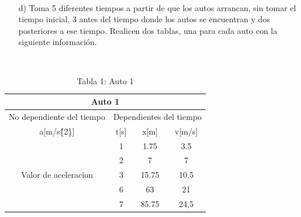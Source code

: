 \documentclass[a4paper, 12pt]{article}
\begin{document}
\begin{enumerate}
\begin{align}
       \end{align} 
    \item [d)] Toma 5 diferentes tiempos a partir de que los autos arrancan, sin tomar el tiempo inicial, 3 antes del tiempo donde los autos se encuentran y dos posteriores a ese tiempo. Realicen dos tablas, una para cada auto con la siguiente información.
    \end{enumerate}\\
    \begin{table}
 \caption{Tabla 1: Auto 1}
    \label{Tabla.1}
    \centering
\begin{tabular}{|c|c|c|c|} 
\hline
\multicolumn{4}{|c|}{Auto 1}                                                          \\ 
\hline
No dependiente del tiempo            & \multicolumn{3}{|l|}{Dependientes del tiempo}  \\ 
\hline
a[m/s\^\{2\}]                         & t[s] & x[m]  & v[m/s]                         \\ 
\hline
\multirow{7}{*}{Valor de aceleracion} & 1    & 1.75  & 3.5                            \\ 

\cline{2-4}
                                      & 2    & 7    & 7                          \\ 
\cline{2-4}
                                      & 3    & 15.75 & 10.5                          \\ 
\cline{2-4}
                                      & 6    & 63    & 21                           \\ 
\cline{2-4}
                                      & 7    & 85.75   & 24,5                             \\
\hline
\end{tabular}
\end{table}
\end{document}
